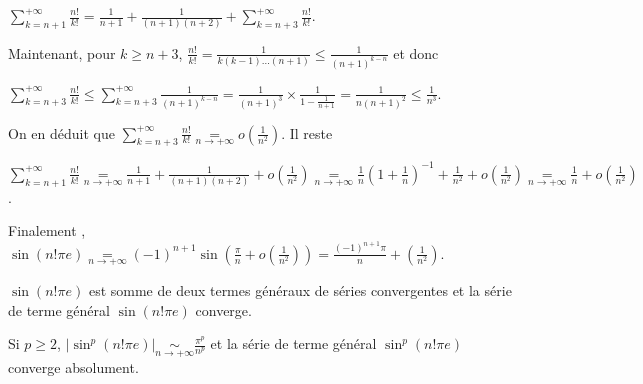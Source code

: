 {{\begin{enumerate}
\begin{center}
$\sum_{k=n+1}^{+\infty}\frac{n!}{k!}=\frac{1}{n+1}+\frac{1}{(n+1)(n+2)}+\sum_{k=n+3}^{+\infty}\frac{n!}{k!}$.
\end{center}

Maintenant, pour $k\geqslant n+3$, $\frac{n!}{k!}=\frac{1}{k(k-1)\ldots(n+1)}\leqslant\frac{1}{(n+1)^{k-n}}$ et donc

\begin{center} 
$\sum_{k=n+3}^{+\infty}\frac{n!}{k!}\leqslant\sum_{k=n+3}^{+\infty}\frac{1}{(n+1)^{k-n}}=\frac{1}{(n+1)^3}\times\frac{1}{1-\frac{1}{n+1}}=\frac{1}{n(n+1)^2}\leqslant\frac{1}{n^3}$.
\end{center}

On en déduit que $\sum_{k=n+3}^{+\infty}\frac{n!}{k!}\underset{n\rightarrow+\infty}{=}o\left(\frac{1}{n^2}\right)$. Il reste

\begin{center}
$\sum_{k=n+1}^{+\infty}\frac{n!}{k!}\underset{n\rightarrow+\infty}{=}
\frac{1}{n+1}+\frac{1}{(n+1)(n+2)}+o\left(\frac{1}{n^2}\right)\underset{n\rightarrow+\infty}{=}\frac{1}{n}\left(1+\frac{1}{n}\right)^{-1}+\frac{1}{n^2}+o\left(\frac{1}{n^2}\right)
\underset{n\rightarrow+\infty}{=}\frac{1}{n}+o\left(\frac{1}{n^2}\right)
$.
\end{center}

Finalement , $\sin(n!\pi e)\underset{n\rightarrow+\infty}{=}(-1)^{n+1}\sin\left(\frac{\pi}{n}+o\left(\frac{1}{n^2}\right)\right)=\frac{(-1)^{n+1}\pi}{n}+\left(\frac{1}{n^2}\right)$.

$\sin(n!\pi e)$ est somme de deux termes généraux de séries convergentes et la série de terme général $\sin(n!\pi e)$ converge.

Si $p\geqslant2$, $|\sin^p(n!\pi e)|\underset{n\rightarrow+\infty}{\sim}\frac{\pi^p}{n^p}$ et la série de terme général $\sin^p(n!\pi e)$ converge absolument.
\end{enumerate}}
}